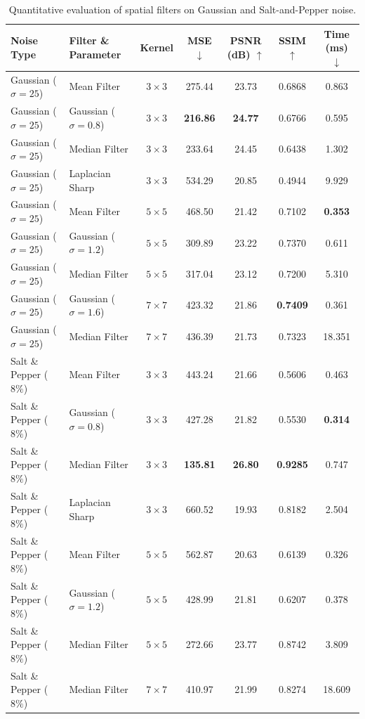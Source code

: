 \documentclass[a4paper,12pt]{article}
\begin{document}
\begin{table}[H]
\centering
\caption{Quantitative evaluation of spatial filters on Gaussian and Salt-and-Pepper noise.}
\label{tab:part_a}
\footnotesize
\begin{tabular}{llccccc}
\toprule
\textbf{Noise Type} & \textbf{Filter \& Parameter} & \textbf{Kernel} & \textbf{MSE} $\downarrow$ & \textbf{PSNR (dB)} $\uparrow$ & \textbf{SSIM} $\uparrow$ & \textbf{Time (ms)} $\downarrow$ \\
\midrule
Gaussian ($\sigma=25$) & Mean Filter & $3\times 3$ & 275.44 & 23.73 & 0.6868 & 0.863 \\
Gaussian ($\sigma=25$) & Gaussian ($\sigma=0.8$) & $3\times 3$ & \textbf{216.86} & \textbf{24.77} & 0.6766 & 0.595 \\
Gaussian ($\sigma=25$) & Median Filter & $3\times 3$ & 233.64 & 24.45 & 0.6438 & 1.302 \\
Gaussian ($\sigma=25$) & Laplacian Sharp & $3\times 3$ & 534.29 & 20.85 & 0.4944 & 9.929 \\
Gaussian ($\sigma=25$) & Mean Filter & $5\times 5$ & 468.50 & 21.42 & 0.7102 & \textbf{0.353} \\
Gaussian ($\sigma=25$) & Gaussian ($\sigma=1.2$) & $5\times 5$ & 309.89 & 23.22 & 0.7370 & 0.611 \\
Gaussian ($\sigma=25$) & Median Filter & $5\times 5$ & 317.04 & 23.12 & 0.7200 & 5.310 \\
Gaussian ($\sigma=25$) & Gaussian ($\sigma=1.6$) & $7\times 7$ & 423.32 & 21.86 & \textbf{0.7409} & 0.361 \\
Gaussian ($\sigma=25$) & Median Filter & $7\times 7$ & 436.39 & 21.73 & 0.7323 & 18.351 \\
\midrule
Salt \& Pepper ($8\%$) & Mean Filter & $3\times 3$ & 443.24 & 21.66 & 0.5606 & 0.463 \\
Salt \& Pepper ($8\%$) & Gaussian ($\sigma=0.8$) & $3\times 3$ & 427.28 & 21.82 & 0.5530 & \textbf{0.314} \\
Salt \& Pepper ($8\%$) & Median Filter & $3\times 3$ & \textbf{135.81} & \textbf{26.80} & \textbf{0.9285} & 0.747 \\
Salt \& Pepper ($8\%$) & Laplacian Sharp & $3\times 3$ & 660.52 & 19.93 & 0.8182 & 2.504 \\
Salt \& Pepper ($8\%$) & Mean Filter & $5\times 5$ & 562.87 & 20.63 & 0.6139 & 0.326 \\
Salt \& Pepper ($8\%$) & Gaussian ($\sigma=1.2$) & $5\times 5$ & 428.99 & 21.81 & 0.6207 & 0.378 \\
Salt \& Pepper ($8\%$) & Median Filter & $5\times 5$ & 272.66 & 23.77 & 0.8742 & 3.809 \\
Salt \& Pepper ($8\%$) & Median Filter & $7\times 7$ & 410.97 & 21.99 & 0.8274 & 18.609 \\
\bottomrule
\end{tabular}
\end{table}
\end{document}
